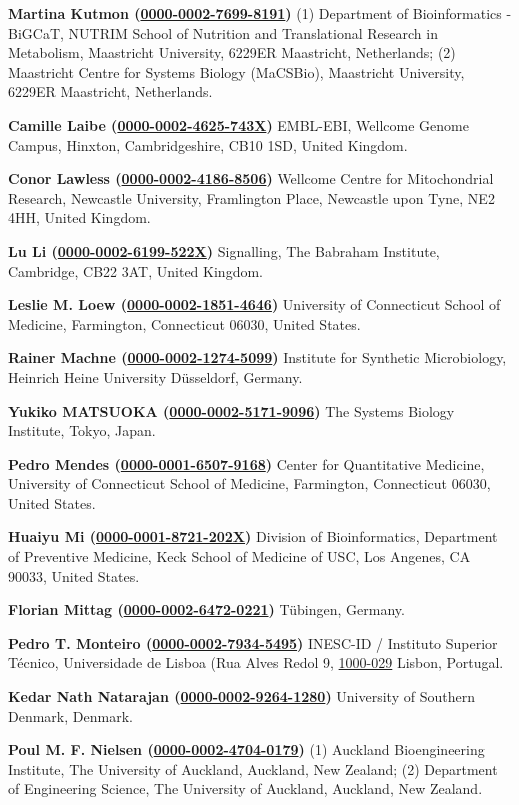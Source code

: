 \documentclass{sbml-paper}
\newcommand{\orcid}[1]{\href{https://orcid.org/#1}{#1}}
\begin{document}
\textbf{Martina Kutmon (\orcid{0000-0002-7699-8191})} (1) Department of Bioinformatics - BiGCaT, NUTRIM School of Nutrition and Translational Research in Metabolism, Maastricht University, 6229ER Maastricht, Netherlands; (2) Maastricht Centre for Systems Biology (MaCSBio), Maastricht University, 6229ER Maastricht, Netherlands.

\textbf{Camille Laibe (\orcid{0000-0002-4625-743X})} EMBL-EBI, Wellcome Genome Campus, Hinxton, Cambridgeshire, CB10 1SD, United Kingdom.

\textbf{Conor Lawless (\orcid{0000-0002-4186-8506})} Wellcome Centre for Mitochondrial Research, Newcastle University, Framlington Place, Newcastle upon Tyne, NE2 4HH, United Kingdom.

\textbf{Lu Li (\orcid{0000-0002-6199-522X})} Signalling, The Babraham Institute, Cambridge, CB22 3AT, United Kingdom.

\textbf{Leslie M. Loew (\orcid{0000-0002-1851-4646})} University of Connecticut School of Medicine, Farmington, Connecticut 06030, United States.

\textbf{Rainer Machne (\orcid{0000-0002-1274-5099})} Institute for Synthetic Microbiology, Heinrich Heine University Düsseldorf, Germany.

\textbf{Yukiko MATSUOKA (\orcid{0000-0002-5171-9096})} The Systems Biology Institute, Tokyo, Japan.

\textbf{Pedro Mendes (\orcid{0000-0001-6507-9168})} Center for Quantitative Medicine, University of Connecticut School of Medicine, Farmington, Connecticut 06030, United States.

\textbf{Huaiyu Mi (\orcid{0000-0001-8721-202X})} Division of Bioinformatics, Department of Preventive Medicine, Keck School of Medicine of USC, Los Angenes, CA 90033, United States.

\textbf{Florian Mittag (\orcid{0000-0002-6472-0221})} Tübingen, Germany.

\textbf{Pedro T. Monteiro (\orcid{0000-0002-7934-5495})} INESC-ID / Instituto Superior Técnico, Universidade de Lisboa (Rua Alves Redol 9, \orcid{1000-029} Lisbon, Portugal.

\textbf{Kedar Nath Natarajan (\orcid{0000-0002-9264-1280})} University of Southern Denmark, Denmark.

\textbf{Poul M. F. Nielsen (\orcid{0000-0002-4704-0179})} (1) Auckland Bioengineering Institute, The University of Auckland, Auckland, New Zealand; (2) Department of Engineering Science, The University of Auckland, Auckland, New Zealand.
\end{document}
